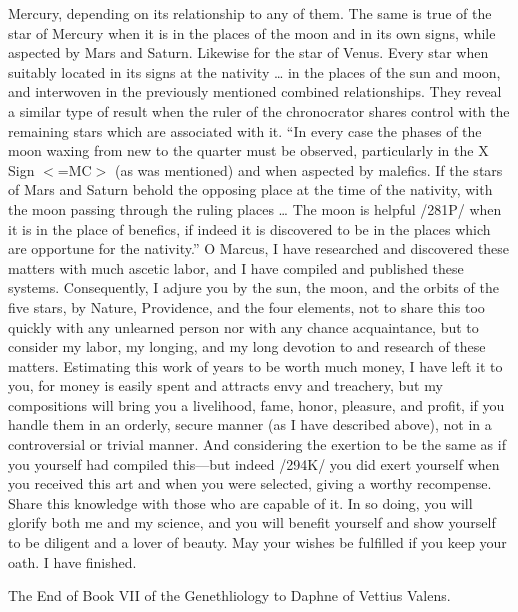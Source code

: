 Mercury, depending on its relationship to any of them. The same is true of the star of Mercury when
it is in the places of the moon and in its own signs, while aspected by Mars and Saturn. Likewise
for the star of Venus. Every star when suitably located in its signs at the nativity … in the places of
the sun and moon, and interwoven in the previously mentioned combined relationships. They
reveal a similar type of result when the ruler of the chronocrator shares control with the remaining
stars which are associated with it.
“In every case the phases of the moon waxing from new to the quarter must be observed,
particularly in the X Sign $<$=MC$>$ (as was mentioned) and when aspected by malefics. If the stars of
Mars and Saturn behold the opposing place at the time of the nativity, with the moon passing
through the ruling places … The moon is helpful /281P/ when it is in the place of benefics, if indeed
it is discovered to be in the places which are opportune for the nativity.”
O Marcus, I have researched and discovered these matters with much ascetic labor, and I have compiled
and published these systems. Consequently, I adjure you by the sun, the moon, and the orbits of the five
stars, by Nature, Providence, and the four elements, not to share this too quickly with any unlearned person
nor with any chance acquaintance, but to consider my labor, my longing, and my long devotion to and
research of these matters. Estimating this work of years to be worth much money, I have left it to you, for
money is easily spent and attracts envy and treachery, but my compositions will bring you a livelihood,
fame, honor, pleasure, and profit, if you handle them in an orderly, secure manner (as I have described
above), not in a controversial or trivial manner. And considering the exertion to be the same as if you
yourself had compiled this—but indeed /294K/ you did exert yourself when you received this art and when
you were selected, giving a worthy recompense. Share this knowledge with those who are capable of it. In
so doing, you will glorify both me and my science, and you will benefit yourself and show yourself to be
diligent and a lover of beauty.
May your wishes be fulfilled if you keep your oath. I have finished.

The End of Book VII of the Genethliology to Daphne of Vettius Valens.

\newpage
